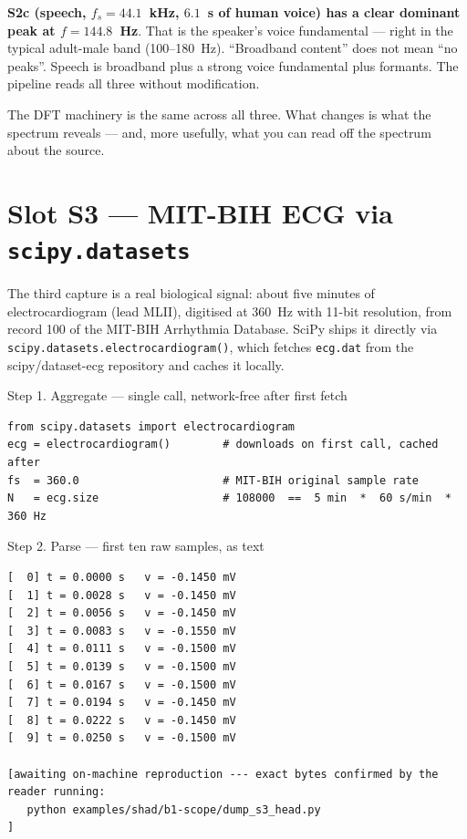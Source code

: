 \documentclass[11pt,a4paper,openany]{book}
\begin{document}
\textbf{S2c (speech, $f_s = 44.1$~kHz, $6.1$~s of human voice) has a
clear dominant peak at $f = 144.8$~Hz}. That is the speaker's voice
fundamental --- right in the typical adult-male band (100--180~Hz).
``Broadband content'' does not mean ``no peaks''. Speech is broadband
plus a strong voice fundamental plus formants. The pipeline reads
all three without modification.

The DFT machinery is the same across all three. What changes is what
the spectrum reveals --- and, more usefully, what you can read off
the spectrum about the source.

\clearpage
\section{Slot S3 --- MIT-BIH ECG via \texttt{scipy.datasets}}
\label{sec:s3}

The third capture is a real biological signal: about five minutes of
electrocardiogram (lead MLII), digitised at 360~Hz with 11-bit
resolution, from record 100 of the MIT-BIH Arrhythmia Database.
SciPy ships it directly via \texttt{scipy.datasets.electrocardiogram()},
which fetches \texttt{ecg.dat} from the scipy/dataset-ecg repository
and caches it locally.

\begin{pipelinestep}{Step 1. Aggregate --- single call, network-free after first fetch}
\begin{lstlisting}[style=shadpython]
from scipy.datasets import electrocardiogram
ecg = electrocardiogram()        # downloads on first call, cached after
fs  = 360.0                      # MIT-BIH original sample rate
N   = ecg.size                   # 108000  ==  5 min  *  60 s/min  *  360 Hz
\end{lstlisting}
\end{pipelinestep}

\begin{pipelinestep}{Step 2. Parse --- first ten raw samples, as text}
\begin{lstlisting}[style=shaddata]
[  0] t = 0.0000 s   v = -0.1450 mV
[  1] t = 0.0028 s   v = -0.1450 mV
[  2] t = 0.0056 s   v = -0.1450 mV
[  3] t = 0.0083 s   v = -0.1550 mV
[  4] t = 0.0111 s   v = -0.1500 mV
[  5] t = 0.0139 s   v = -0.1500 mV
[  6] t = 0.0167 s   v = -0.1500 mV
[  7] t = 0.0194 s   v = -0.1450 mV
[  8] t = 0.0222 s   v = -0.1450 mV
[  9] t = 0.0250 s   v = -0.1500 mV

[awaiting on-machine reproduction --- exact bytes confirmed by the reader running:
   python examples/shad/b1-scope/dump_s3_head.py
]
\end{lstlisting}
\end{pipelinestep}
\end{document}
